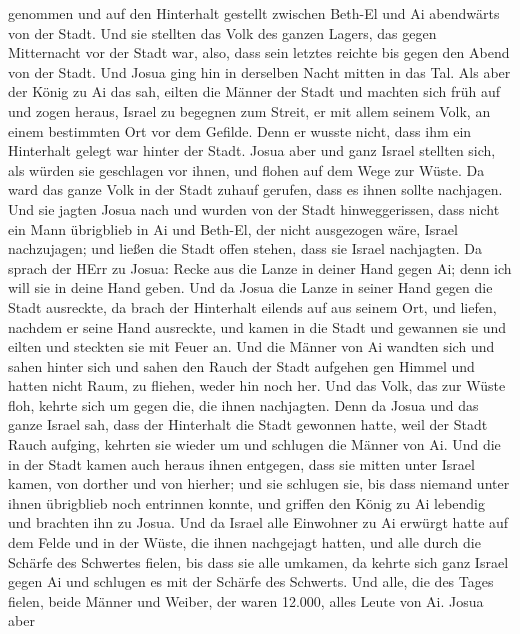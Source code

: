 genommen und auf den Hinterhalt gestellt zwischen Beth-El und Ai
abendwärts von der Stadt.  Und sie stellten das Volk des
ganzen Lagers, das gegen Mitternacht vor der Stadt war, also, dass sein
letztes reichte bis gegen den Abend von der Stadt. Und Josua ging hin in
derselben Nacht mitten in das Tal.  Als aber der König zu
Ai das sah, eilten die Männer der Stadt und machten sich früh auf und
zogen heraus, Israel zu begegnen zum Streit, er mit allem seinem Volk,
an einem bestimmten Ort vor dem Gefilde. Denn er wusste nicht, dass ihm
ein Hinterhalt gelegt war hinter der Stadt.  Josua aber und
ganz Israel stellten sich, als würden sie geschlagen vor ihnen, und
flohen auf dem Wege zur Wüste.  Da ward das ganze Volk in
der Stadt zuhauf gerufen, dass es ihnen sollte nachjagen. 
Und sie jagten Josua nach und wurden von der Stadt hinweggerissen, dass
nicht ein Mann übrigblieb in Ai und Beth-El, der nicht ausgezogen wäre,
Israel nachzujagen; und ließen die Stadt offen stehen, dass sie Israel
nachjagten.  Da sprach der HErr zu Josua: Recke aus die
Lanze in deiner Hand gegen Ai; denn ich will sie in deine Hand geben.
Und da Josua die Lanze in seiner Hand gegen die Stadt ausreckte,
 da brach der Hinterhalt eilends auf aus seinem Ort, und
liefen, nachdem er seine Hand ausreckte, und kamen in die Stadt und
gewannen sie und eilten und steckten sie mit Feuer an.  Und
die Männer von Ai wandten sich und sahen hinter sich und sahen den Rauch
der Stadt aufgehen gen Himmel und hatten nicht Raum, zu fliehen, weder
hin noch her. Und das Volk, das zur Wüste floh, kehrte sich um gegen
die, die ihnen nachjagten.  Denn da Josua und das ganze
Israel sah, dass der Hinterhalt die Stadt gewonnen hatte, weil der Stadt
Rauch aufging, kehrten sie wieder um und schlugen die Männer von Ai.
 Und die in der Stadt kamen auch heraus ihnen entgegen,
dass sie mitten unter Israel kamen, von dorther und von hierher; und sie
schlugen sie, bis dass niemand unter ihnen übrigblieb noch entrinnen
konnte,  und griffen den König zu Ai lebendig und brachten
ihn zu Josua.  Und da Israel alle Einwohner zu Ai erwürgt
hatte auf dem Felde und in der Wüste, die ihnen nachgejagt hatten, und
alle durch die Schärfe des Schwertes fielen, bis dass sie alle umkamen,
da kehrte sich ganz Israel gegen Ai und schlugen es mit der Schärfe des
Schwerts.  Und alle, die des Tages fielen, beide Männer und
Weiber, der waren 12.000, alles Leute von Ai.  Josua aber
